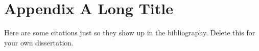 \documentclass[oneside, 11pt]{amsbook}
\begin{document}

\appendix

\chapter{Appendix A Long Title}
\label{ch:AppendixALabel}



\newpage

Here are some citations just so they show up in the bibliography. Delete this for your own dissertation.
\cite{ComputingPersistentHomology}
\cite{witnesscomplexes}
\cite{Cohen-Steiner2007}
\cite{Bubenik_2007}
\cite{chazal2014robust}
\cite{persistence_images}
\cite{carlsson2021new}
\cite{carlsson2023witness}
\cite{Carlsson2022}
\cite{chazal2016structure}
\cite{boissonnat_chazal_yvinec_2018}


\backmatter



\end{document}
